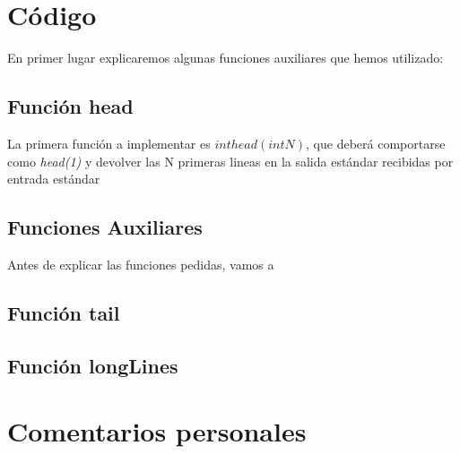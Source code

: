 \chapter{Código}
En primer lugar explicaremos algunas funciones auxiliares que hemos utilizado: 
\section{Función head}
La primera función a implementar es $int head(int N)$, que deberá comportarse como \textit{head(1)} y devolver las N primeras lineas en la salida estándar recibidas por entrada estándar
\section{Funciones Auxiliares}
Antes de explicar las funciones pedidas, vamos a 
\section{Función tail}


\section{Función longLines}
\chapter{Comentarios personales}